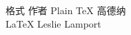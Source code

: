\begin{tabbing}
格式\hspace{3em} \= 作者 \kill
Plain \TeX  \> 高德纳 \\
\LaTeX      \> Leslie Lamport
\end{tabbing}
